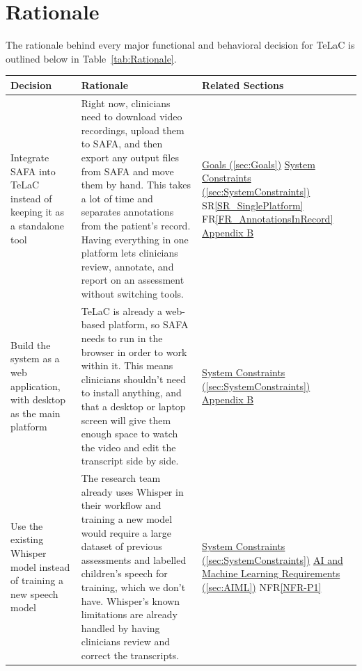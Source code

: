 \documentclass[12pt]{article}
\newcommand{\srref}[1]{SR\ref{#1}}
\newcommand{\rref}[1]{FR\ref{#1}}
\newcommand{\nfrref}[1]{NFR\ref{#1}}
\begin{document}

\section{Rationale} \label{sec:Rationale}
The rationale behind every major functional and behavioral decision for TeLaC is outlined below in Table~\ref{tab:Rationale}.

\begin{longtable}{>{\raggedright\arraybackslash}p{} >{\raggedright\arraybackslash}p{} >{\raggedright\arraybackslash}p{}}
\toprule
Decision & Rationale & Related Sections\\
\midrule
\endhead
Integrate SAFA into TeLaC instead of keeping it as a standalone tool & 
Right now, clinicians need to download video recordings, upload them to SAFA, and then export any output files from SAFA and move them by hand. This takes a lot of time and separates annotations from the patient's record. Having everything in one platform lets clinicians review, annotate, and report on an assessment without switching tools. & \hyperref[sec:Goals]{Goals (\ref*{sec:Goals})} \newline \hyperref[sec:SystemConstraints]{System Constraints (\ref*{sec:SystemConstraints})} \newline \srref{SR_SinglePlatform} \newline \rref{FR_AnnotationsInRecord} \newline \hyperref[sec:AppendixB]{Appendix B}\\
\midrule
Build the system as a web application, with desktop as the main platform & 
TeLaC is already a web-based platform, so SAFA needs to run in the browser in order to work within it. This means clinicians shouldn't need to install anything, and that a desktop or laptop screen will give them enough space to watch the video and edit the transcript side by side. & \hyperref[sec:SystemConstraints]{System Constraints (\ref*{sec:SystemConstraints})} \newline \hyperref[sec:AppendixB]{Appendix B}\\
\midrule
Use the existing Whisper model instead of training a new speech model & 
The research team already uses Whisper in their workflow and training a new model would require a large dataset of previous assessments and labelled children's speech for training, which we don't have. Whisper's known limitations are already handled by having clinicians review and correct the transcripts. & \hyperref[sec:SystemConstraints]{System Constraints (\ref*{sec:SystemConstraints})} \newline \hyperref[sec:AIML]{AI and Machine Learning Requirements (\ref*{sec:AIML})} \newline \nfrref{NFR-P1}\\

\end{longtable}
\end{document}
